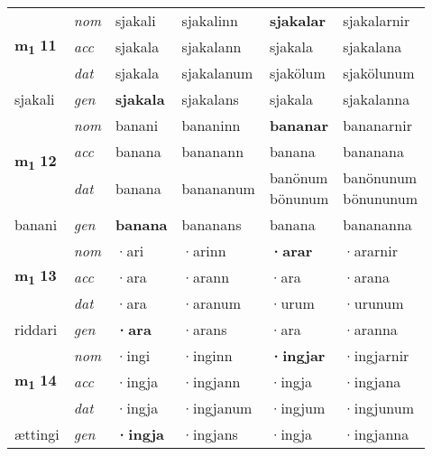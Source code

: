 \begin{longtable}[l]{X>{\footnotesize\itshape}XXXXX}
\multirow{3}{*}{{{\textbf{m{\textsubscript{1}}} \Large{\textbf{11}}}}}  
 & nom & sjakali & sjakalinn    & \textbf{sjakalar} & sjakalarnir  \\*
 & acc & sjakala  & sjakalann   & sjakala  & sjakalana \\*
 & dat & sjakala & sjakalanum   & sjakölum & sjakölunum \\*
 {\footnotesize{sjakali}} &  gen & \textbf{sjakala}  & sjakalans  & sjakala & sjakalanna \\
\cmidrule{1-6}


\multirow{3}{*}{{{\textbf{m{\textsubscript{1}}} \Large{\textbf{12}}}}}  
 & nom & banani & bananinn    & \textbf{bananar} & bananarnir  \\*
 & acc & banana  & bananann   & banana  & bananana \\*
 & dat & banana & banananum   & \specialcell{banönum\\ bönunum} & \specialcell{banönunum\\ bönununum} \\*
 {\footnotesize{banani}} &  gen & \textbf{banana}  & bananans  & banana & banananna \\
\cmidrule{1-6}


\multirow{3}{*}{{{\textbf{m{\textsubscript{1}}} \Large{\textbf{13}}}}}  
 & nom & ·ari & ·arinn    & \textbf{·arar} & ·ararnir  \\*
 & acc & ·ara  & ·arann   & ·ara  & ·arana \\*
 & dat & ·ara & ·aranum   & ·urum & ·urunum \\*
 {\footnotesize{riddari}} &  gen & \textbf{·ara}  & ·arans  & ·ara & ·aranna \\
\cmidrule{1-6}


\multirow{3}{*}{{{\textbf{m{\textsubscript{1}}} \Large{\textbf{14}}}}}  
 & nom & ·ingi & ·inginn    & \textbf{·ingjar} & ·ingjarnir  \\*
 & acc & ·ingja  & ·ingjann   & ·ingja  & ·ingjana \\*
 & dat & ·ingja & ·ingjanum   & ·ingjum & ·ingjunum \\*
 {\footnotesize{ættingi}} &  gen & \textbf{·ingja}  & ·ingjans  & ·ingja & ·ingjanna \\
\cmidrule{1-6}



\end{longtable}
